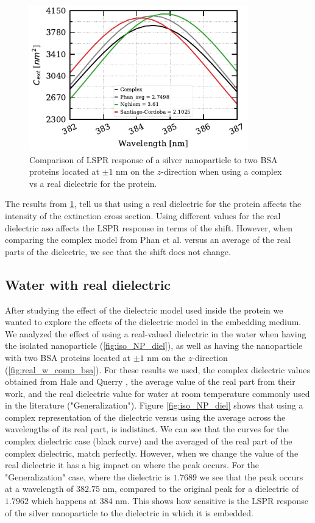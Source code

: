 \begin{figure} %
    \centering
    \includegraphics[width=0.85\textwidth]{bsa_diel_study.pdf} 
    \caption{Comparison of LSPR response of a silver nanoparticle to two BSA proteins located at $\pm1$ nm on the $z$-direction
    when using a complex vs a real dielectric for the protein.}
    \label{fig:bsa_diel}
 \end{figure}

The results from \ref{fig:bsa_diel}, tell us that using a real dielectric for the protein affects the intensity of the extinction cross section. Using 
different values for the real dielectric aso affects the LSPR response in terms of the shift. However, when comparing the complex model from Phan et al. versus
an average of the real parts of the dielectric, we see that the shift does not change. 

\subsection{Water with real dielectric}

After studying the effect of the dielectric model used inside the protein we wanted to explore the effects of the dielectric model in the 
embedding medium. We analyzed the effect of using a real-valued dielectric in the water when having the isolated nanoparticle (\ref{fig:iso_NP_diel}), 
as well as having the nanoparticle with two BSA proteins located at $\pm1$ nm on the $z$-direction (\ref{fig:real_w_comp_bsa}). For these results we used, 
the complex dielectric values obtained from Hale and Querry \cite{HaleQuerry1972}, the average value of the real part from their work, and the real 
dielectric value for water at room temperature commonly used in the literature ("Generalization"). Figure \ref{fig:iso_NP_diel} shows
that using a complex representation of the dielectric versus using the average across the wavelengths of its real part, is indistinct. We can see that the curves
for the complex dielectric case (black curve) and the averaged of the real part of the complex dielectric, match perfectly. However, when we change the value of 
the real dielectric it has a big impact on where the peak occurs. For the "Generalization" case, where the dielectric is $1.7689$ we see that the peak occurs at 
a wavelength of $382.75$ nm, compared to the original peak for a dielectric of $1.7962$ which happens at $384$ nm. This shows how sensitive is the LSPR response of the 
silver nanoparticle to the dielectric in which it is embedded. 
 
